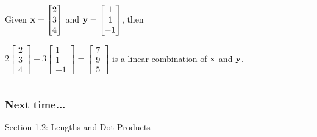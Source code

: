 \begin{example}
	Given ${\bf x} = \begin{bmatrix}
	2 \\ 3 \\ 4
		\end{bmatrix}$ and ${\bf y} = \begin{bmatrix}
	1 \\ 1 \\ -1
		\end{bmatrix}$, then 
		
		
		$
		2\begin{bmatrix}
	2 \\ 3 \\ 4
		\end{bmatrix}  + 3\begin{bmatrix}
	1 \\ 1 \\ -1
		\end{bmatrix} = \begin{bmatrix}
	7 \\ 9 \\ 5
		\end{bmatrix} 
		$ is a linear combination of ${\bf x}$ and ${\bf y}$.
\end{example}




 \rule[0.01in]{\textwidth}{0.0025in}











\subsubsection*{Next time...}
Section 1.2: Lengths and Dot Products

